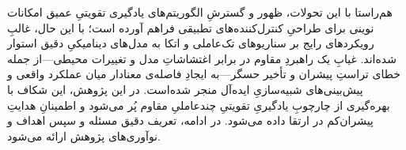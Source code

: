 هم‌راستا با این تحولات، ظهور و گسترشِ الگوریتم‌های یادگیری تقویتیِ عمیق امکانات نوینی برای طراحیِ کنترل‌کننده‌های تطبیقی فراهم آورده است؛ با این حال، غالبِ رویکردهای رایج بر سناریوهای تک‌عاملی و اتکا به مدل‌های دینامیکیِ دقیق استوار شده‌اند. غیابِ یک راهبردِ مقاوم در برابر اغتشاشاتِ مدل و تغییرات محیطی—از جمله خطای تراستِ پیشران و تأخیر حسگر—به ایجادِ فاصله‌ی معنادار میان عملکرد واقعی و پیش‌بینی‌های شبیه‌سازیِ ایده‌آل منجر شده‌است. در این پژوهش، این شکاف با بهره‌گیری از چارچوبِ یادگیریِ تقویتیِ چندعاملیِ مقاوم پُر می‌شود و اطمینانِ هدایتِ پیشران‌کم در  ارتقا داده می‌شود. در ادامه، تعریف دقیق مسئله و سپس اهداف و نوآوری‌های پژوهش ارائه می‌شود.
